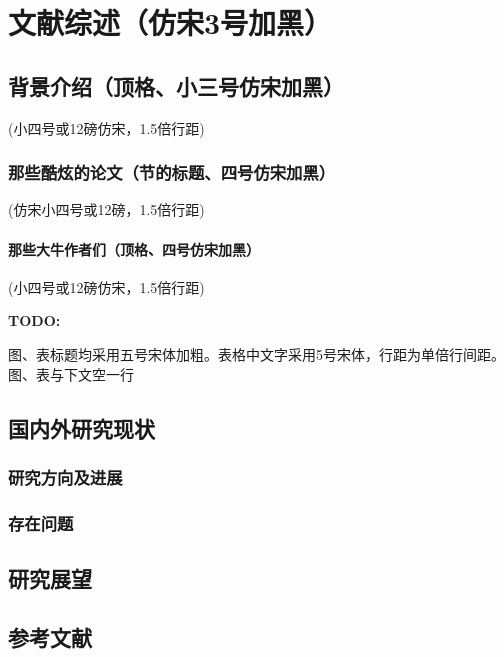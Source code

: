 \chapter{文献综述（仿宋3号加黑）}
\section{背景介绍（顶格、小三号仿宋加黑）}
(小四号或12磅仿宋，1.5倍行距)

\subsection{那些酷炫的论文（节的标题、四号仿宋加黑）}
(仿宋小四号或12磅，1.5倍行距)
\subsubsection{那些大牛作者们（顶格、四号仿宋加黑）}
(小四号或12磅仿宋，1.5倍行距)

{\bfseries TODO:}

图、表标题均采用五号宋体加粗。表格中文字采用5号宋体，行距为单倍行间距。图、表与下文空一行
\section{国内外研究现状}
\subsection{研究方向及进展}
\subsection{存在问题}
\section{研究展望}
\section{参考文献}
